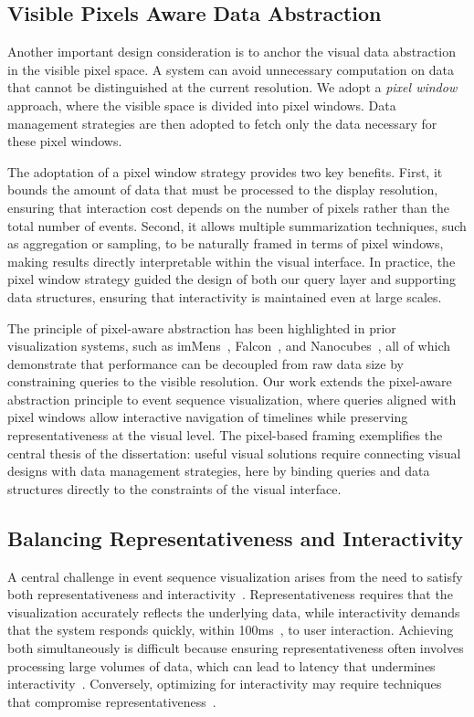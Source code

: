 \begin{refsection}
\subsection{Visible Pixels Aware Data Abstraction}
\label{subsec:pixel_abstraction}

Another important design consideration is to anchor the visual data abstraction in the visible pixel space. A system can avoid unnecessary computation on data that cannot be distinguished at the current resolution. We adopt a \emph{pixel window} approach, where the visible space is divided into pixel windows. Data management strategies are then adopted to fetch only the data necessary for these pixel windows.

The adoptation of a pixel window strategy provides two key benefits. First, it bounds the amount of data that must be processed to the display resolution, ensuring that interaction cost depends on the number of pixels rather than the total number of events. Second, it allows multiple summarization techniques, such as aggregation or sampling, to be naturally framed in terms of pixel windows, making results directly interpretable within the visual interface. In practice, the pixel window strategy guided the design of both our query layer and supporting data structures, ensuring that interactivity is maintained even at large scales.

The principle of pixel-aware abstraction has been highlighted in prior visualization systems, such as imMens~\cite{liu2013immens}, Falcon~\cite{moritz2019falcon}, and Nanocubes~\cite{lins2013nanocubes}, all of which demonstrate that performance can be decoupled from raw data size by constraining queries to the visible resolution. Our work extends the pixel-aware abstraction principle to event sequence visualization, where queries aligned with pixel windows allow interactive navigation of timelines while preserving representativeness at the visual level. The pixel-based framing exemplifies the central thesis of the dissertation: useful visual solutions require connecting visual designs with data management strategies, here by binding queries and data structures directly to the constraints of the visual interface.

\newpage
\subsection{Balancing Representativeness and Interactivity}
\label{subsec:balance}

A central challenge in event sequence visualization arises from the need to satisfy both representativeness and interactivity~\cite{guo2021survey, ulmer2023survey}. Representativeness requires that the visualization accurately reflects the underlying data, while interactivity demands that the system responds quickly, within 100ms~\cite{battle2019role}, to user interaction. Achieving both simultaneously is difficult because ensuring representativeness often involves processing large volumes of data, which can lead to latency that undermines interactivity~\cite{battle2019role, moritz2017trust}. Conversely, optimizing for interactivity may require techniques that compromise representativeness~\cite{battle2020structured}.


\end{refsection}

